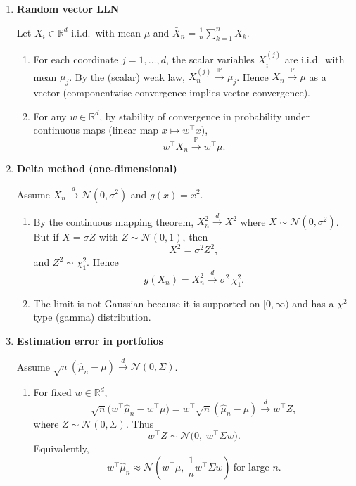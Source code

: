 \documentclass[11pt]{article}
\begin{document}
\begin{enumerate}
\bigskip

\item \textbf{Random vector LLN}

Let $X_i\in\mathbb{R}^d$ i.i.d.\ with mean $\mu$ and $\bar X_n=\frac1n\sum_{k=1}^n X_k$.

\begin{enumerate}
\item For each coordinate $j=1,\dots,d$, the scalar variables $X_i^{(j)}$ are i.i.d.\ with mean $\mu_j$.
By the (scalar) weak law, $\bar X_n^{(j)}\xrightarrow{\mathbb{P}}\mu_j$.
Hence $\bar X_n\xrightarrow{\mathbb{P}}\mu$ as a vector (componentwise convergence implies vector convergence).

\item For any $w\in\mathbb{R}^d$, by stability of convergence in probability under continuous maps (linear map $x\mapsto w^\top x$),
\[
w^\top \bar X_n \xrightarrow{\mathbb{P}} w^\top \mu.
\]
\end{enumerate}

\bigskip

\item \textbf{Delta method (one-dimensional)}

Assume $X_n\xrightarrow{d}\mathcal{N}(0,\sigma^2)$ and $g(x)=x^2$.

\begin{enumerate}
\item By the continuous mapping theorem, $X_n^2 \xrightarrow{d} X^2$ where $X\sim\mathcal{N}(0,\sigma^2)$.
But if $X=\sigma Z$ with $Z\sim\mathcal{N}(0,1)$, then
\[
X^2=\sigma^2 Z^2,
\]
and $Z^2\sim \chi^2_1$. Hence
\[
g(X_n)=X_n^2 \xrightarrow{d} \sigma^2\,\chi^2_1.
\]

\item The limit is not Gaussian because it is supported on $[0,\infty)$ and has a $\chi^2$-type (gamma) distribution.
\end{enumerate}

\bigskip

\item \textbf{Estimation error in portfolios}

Assume $\sqrt{n}(\hat\mu_n-\mu)\xrightarrow{d}\mathcal{N}(0,\Sigma)$.

\begin{enumerate}
\item For fixed $w\in\mathbb{R}^d$,
\[
\sqrt{n}\big(w^\top\hat\mu_n-w^\top\mu\big)
=
w^\top \sqrt{n}(\hat\mu_n-\mu)
\xrightarrow{d} w^\top Z,
\]
where $Z\sim\mathcal{N}(0,\Sigma)$. Thus
\[
w^\top Z \sim \mathcal{N}\big(0,\; w^\top \Sigma w\big).
\]
Equivalently,
\[
w^\top \hat\mu_n \approx \mathcal{N}\!\left(w^\top\mu,\ \frac{1}{n}w^\top\Sigma w\right)\ \text{for large }n.
\]


\end{enumerate}
\end{enumerate}
\end{document}
